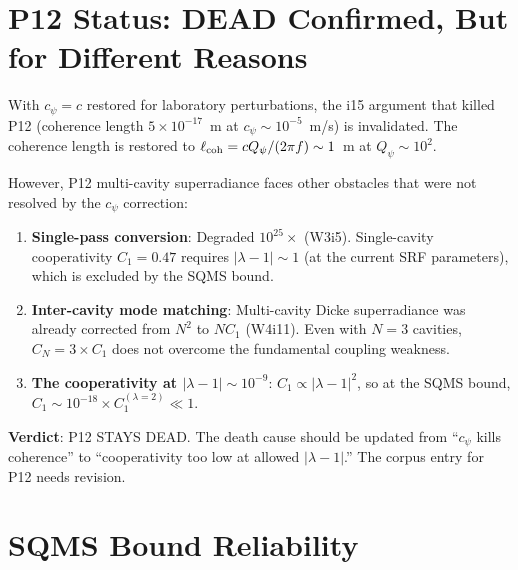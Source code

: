 \documentclass[11pt]{article}
\newcommand{\ee}[1]{\times 10^{#1}}
\newcommand{\Qpsi}{Q_\psi}
\begin{document}
\section{P12 Status: DEAD Confirmed, But for Different Reasons}

With $c_\psi = c$ restored for laboratory perturbations, the i15
argument that killed P12 (coherence length $5\ee{-17}$~m at
$c_\psi \sim 10^{-5}$~m/s) is invalidated. The coherence length
is restored to $\ell_{\rm coh} = c \Qpsi/(2\pi f) \sim 1$~m at
$\Qpsi \sim 10^2$.

However, P12 multi-cavity superradiance faces other obstacles that
were not resolved by the $c_\psi$ correction:
\begin{enumerate}
\item \textbf{Single-pass conversion}: Degraded $10^{25}\times$ (W3i5).
  Single-cavity cooperativity $C_1 = 0.47$ requires $|\lambda-1| \sim 1$
  (at the current SRF parameters), which is excluded by the SQMS bound.
\item \textbf{Inter-cavity mode matching}: Multi-cavity Dicke
  superradiance was already corrected from $N^2$ to $N C_1$ (W4i11).
  Even with $N = 3$ cavities, $C_N = 3 \times C_1$ does not overcome
  the fundamental coupling weakness.
\item \textbf{The cooperativity at $|\lambda-1| \sim 10^{-9}$}:
  $C_1 \propto |\lambda-1|^2$, so at the SQMS bound,
  $C_1 \sim 10^{-18} \times C_1^{(\lambda=2)} \ll 1$.
\end{enumerate}

\textbf{Verdict}: P12 STAYS DEAD. The death cause should be updated
from ``$c_\psi$ kills coherence'' to ``cooperativity too low at
allowed $|\lambda-1|$.'' The corpus entry for P12 needs revision.


\section{SQMS Bound Reliability}
\end{document}
